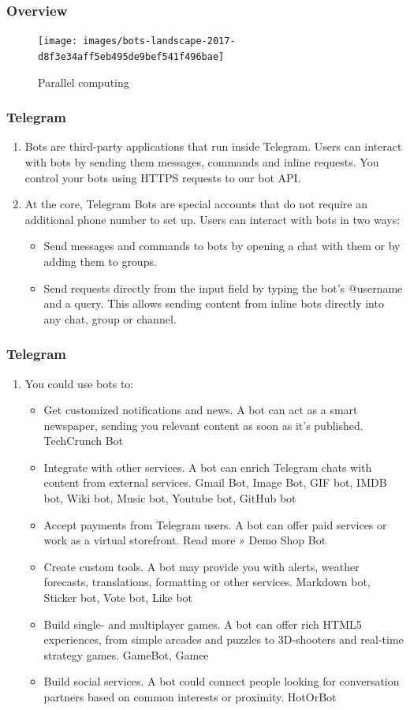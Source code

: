 \documentclass[11pt]{beamer}
\begin{document}
\begin{frame}
\frametitle{Overview}
\begin{figure}[h]
	\centering
	\texttt{[image: images/bots-landscape-2017-d8f3e34aff5eb495de9bef541f496bae]}
	\caption{Parallel computing}
	\label{parallel_openmp}
\end{figure}
\end{frame}

\begin{frame}
\frametitle{Telegram}
\begin{enumerate}
	\item Bots are third-party applications that run inside Telegram. Users can interact with bots by sending them messages, commands and inline requests. You control your bots using HTTPS requests to our bot API.
	\item At the core, Telegram Bots are special accounts that do not require an additional phone number to set up. Users can interact with bots in two ways:
		\begin{itemize}
		\item Send messages and commands to bots by opening a chat with them or by adding them to groups.
		\item Send requests directly from the input field by typing the bot's @username and a query. This allows sending content from inline bots directly into any chat, group or channel.
	\end{itemize}
\end{enumerate}
\end{frame}

\begin{frame}
\frametitle{Telegram}
\begin{enumerate}
	\item You could use bots to:
	\begin{itemize}
		\item Get customized notifications and news. A bot can act as a smart newspaper, sending you relevant content as soon as it's published.
		TechCrunch Bot
		\item Integrate with other services. A bot can enrich Telegram chats with content from external services.
		Gmail Bot, Image Bot, GIF bot, IMDB bot, Wiki bot, Music bot, Youtube bot, GitHub bot
		\item Accept payments from Telegram users. A bot can offer paid services or work as a virtual storefront. Read more »
		Demo Shop Bot
		\item Create custom tools. A bot may provide you with alerts, weather forecasts, translations, formatting or other services.
		Markdown bot, Sticker bot, Vote bot, Like bot
		\item Build single- and multiplayer games. A bot can offer rich HTML5 experiences, from simple arcades and puzzles to 3D-shooters and real-time strategy games.
		GameBot, Gamee
		\item Build social services. A bot could connect people looking for conversation partners based on common interests or proximity.
		HotOrBot
	\end{itemize}
\end{enumerate}
\end{frame}
\end{document}
